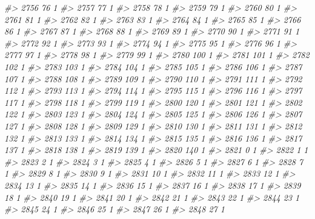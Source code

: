 \documentclass[]{article}
\newenvironment{Shaded}{\begin{snugshade}}{\end{snugshade}}
\newcommand{\CommentTok}[1]{\textcolor[rgb]{0.56,0.35,0.01}{\textit{#1}}}
\begin{document}
\begin{Shaded}
\begin{Highlighting}[]
\CommentTok{#> 2756  76  1}
\CommentTok{#> 2757  77  1}
\CommentTok{#> 2758  78  1}
\CommentTok{#> 2759  79  1}
\CommentTok{#> 2760  80  1}
\CommentTok{#> 2761  81  1}
\CommentTok{#> 2762  82  1}
\CommentTok{#> 2763  83  1}
\CommentTok{#> 2764  84  1}
\CommentTok{#> 2765  85  1}
\CommentTok{#> 2766  86  1}
\CommentTok{#> 2767  87  1}
\CommentTok{#> 2768  88  1}
\CommentTok{#> 2769  89  1}
\CommentTok{#> 2770  90  1}
\CommentTok{#> 2771  91  1}
\CommentTok{#> 2772  92  1}
\CommentTok{#> 2773  93  1}
\CommentTok{#> 2774  94  1}
\CommentTok{#> 2775  95  1}
\CommentTok{#> 2776  96  1}
\CommentTok{#> 2777  97  1}
\CommentTok{#> 2778  98  1}
\CommentTok{#> 2779  99  1}
\CommentTok{#> 2780 100  1}
\CommentTok{#> 2781 101  1}
\CommentTok{#> 2782 102  1}
\CommentTok{#> 2783 103  1}
\CommentTok{#> 2784 104  1}
\CommentTok{#> 2785 105  1}
\CommentTok{#> 2786 106  1}
\CommentTok{#> 2787 107  1}
\CommentTok{#> 2788 108  1}
\CommentTok{#> 2789 109  1}
\CommentTok{#> 2790 110  1}
\CommentTok{#> 2791 111  1}
\CommentTok{#> 2792 112  1}
\CommentTok{#> 2793 113  1}
\CommentTok{#> 2794 114  1}
\CommentTok{#> 2795 115  1}
\CommentTok{#> 2796 116  1}
\CommentTok{#> 2797 117  1}
\CommentTok{#> 2798 118  1}
\CommentTok{#> 2799 119  1}
\CommentTok{#> 2800 120  1}
\CommentTok{#> 2801 121  1}
\CommentTok{#> 2802 122  1}
\CommentTok{#> 2803 123  1}
\CommentTok{#> 2804 124  1}
\CommentTok{#> 2805 125  1}
\CommentTok{#> 2806 126  1}
\CommentTok{#> 2807 127  1}
\CommentTok{#> 2808 128  1}
\CommentTok{#> 2809 129  1}
\CommentTok{#> 2810 130  1}
\CommentTok{#> 2811 131  1}
\CommentTok{#> 2812 132  1}
\CommentTok{#> 2813 133  1}
\CommentTok{#> 2814 134  1}
\CommentTok{#> 2815 135  1}
\CommentTok{#> 2816 136  1}
\CommentTok{#> 2817 137  1}
\CommentTok{#> 2818 138  1}
\CommentTok{#> 2819 139  1}
\CommentTok{#> 2820 140  1}
\CommentTok{#> 2821   0  1}
\CommentTok{#> 2822   1  1}
\CommentTok{#> 2823   2  1}
\CommentTok{#> 2824   3  1}
\CommentTok{#> 2825   4  1}
\CommentTok{#> 2826   5  1}
\CommentTok{#> 2827   6  1}
\CommentTok{#> 2828   7  1}
\CommentTok{#> 2829   8  1}
\CommentTok{#> 2830   9  1}
\CommentTok{#> 2831  10  1}
\CommentTok{#> 2832  11  1}
\CommentTok{#> 2833  12  1}
\CommentTok{#> 2834  13  1}
\CommentTok{#> 2835  14  1}
\CommentTok{#> 2836  15  1}
\CommentTok{#> 2837  16  1}
\CommentTok{#> 2838  17  1}
\CommentTok{#> 2839  18  1}
\CommentTok{#> 2840  19  1}
\CommentTok{#> 2841  20  1}
\CommentTok{#> 2842  21  1}
\CommentTok{#> 2843  22  1}
\CommentTok{#> 2844  23  1}
\CommentTok{#> 2845  24  1}
\CommentTok{#> 2846  25  1}
\CommentTok{#> 2847  26  1}
\CommentTok{#> 2848  27  1}

\end{Highlighting}
\end{Shaded}
\end{document}
